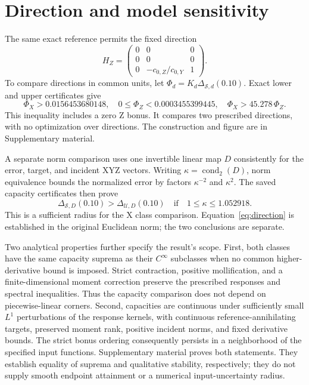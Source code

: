 \documentclass{optica-article}
\begin{document}
\section{Direction and model sensitivity}
The same exact reference permits the fixed direction
\begin{equation}
 H_Z=\begin{pmatrix}0&0&0\\0&0&0\\0&-c_{0,Z}/c_{0,Y}&1\end{pmatrix}.
\end{equation}
To compare directions in common units, let $\Phi_d=K_d\Delta_{\mathcal S,d}(0.10)$. Exact lower and upper certificates give
\begin{equation}
 \Phi_X>0.0156453680148,\quad
 0\leq\Phi_Z<0.0003455399445,\quad
 \Phi_X>45.278\,\Phi_Z.
 \label{eq:direction}
\end{equation}
This inequality includes a zero Z bonus. It compares two prescribed directions, with no optimization over directions. The construction and figure are in Supplementary material.

A separate norm comparison uses one invertible linear map $D$ consistently for the error, target, and incident XYZ vectors. Writing $\kappa=\operatorname{cond}_2(D)$, norm equivalence bounds the normalized error by factors $\kappa^{-2}$ and $\kappa^2$. The saved capacity certificates then prove
\begin{equation}
 \Delta_{\mathcal S,D}(0.10)>\Delta_{\mathcal U,D}(0.10)
 \quad\text{if}\quad 1\leq\kappa\leq1.052918.
 \label{eq:norm}
\end{equation}
This is a sufficient radius for the X class comparison. Equation~\eqref{eq:direction} is established in the original Euclidean norm; the two conclusions are separate.

Two analytical properties further specify the result's scope. First, both classes have the same capacity suprema as their $C^\infty$ subclasses when no common higher-derivative bound is imposed. Strict contraction, positive mollification, and a finite-dimensional moment correction preserve the prescribed responses and spectral inequalities. Thus the capacity comparison does not depend on piecewise-linear corners. Second, capacities are continuous under sufficiently small $L^1$ perturbations of the response kernels, with continuous reference-annihilating targets, preserved moment rank, positive incident norms, and fixed derivative bounds. The strict bonus ordering consequently persists in a neighborhood of the specified input functions. Supplementary material proves both statements. They establish equality of suprema and qualitative stability, respectively; they do not supply smooth endpoint attainment or a numerical input-uncertainty radius.
\end{document}
